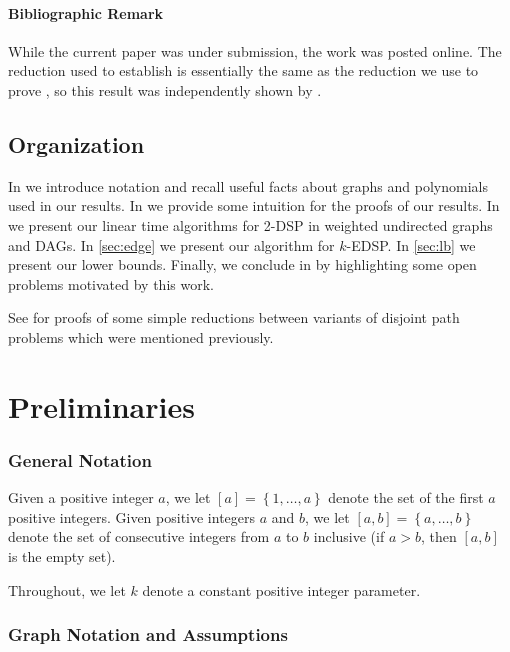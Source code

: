 \documentclass[11pt]{article}
\newcommand{\set}[1]{\left\{#1\right\}}
\theoremstyle{definition}
\begin{document}
\paragraph{Bibliographic Remark}
While the current paper was under submission, the work \cite{BentertFominGolovach2024}
 was posted online.
The reduction used to establish \cite[Theorem 1]{BentertFominGolovach2024} is essentially the same as the reduction we use to prove ,
so this result was independently shown by \cite{BentertFominGolovach2024}.

\subsection*{Organization}
In  we introduce notation and recall useful facts about graphs and polynomials used in our results. 
In  we provide some intuition for the proofs of our results.
In  we present our linear time algorithms for \textsf{2-DSP} in weighted undirected graphs and DAGs. In \cref{sec:edge} we present our algorithm for \textsf{$k$-EDSP}. In \cref{sec:lb} we present our lower bounds.
Finally, we conclude in  by highlighting some open problems motivated by this work.

See  for proofs of some simple reductions between variants of disjoint path problems which were mentioned previously.

\section{Preliminaries}
\label{sec:prelim}

\subsubsection*{General Notation}

Given a positive integer $a$, we let $[a] = \set{1, \dots, a}$ denote the set of the first  $a$ positive integers.
Given positive integers $a$ and $b$, we let $[a,b] = \set{a, \dots, b}$ denote the set of consecutive integers from $a$ to $b$ inclusive (if $a > b$, then $[a,b]$ is the empty set).

Throughout, we let $k$ denote a constant positive integer parameter.

\subsubsection*{Graph Notation and Assumptions}
\end{document}
